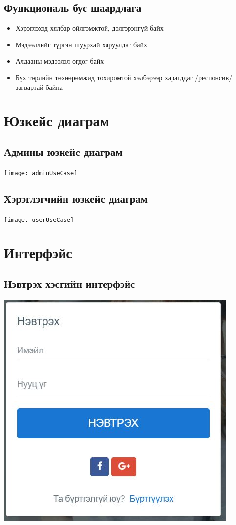 \documentclass[
oneside, %
english, %
onehalfspacing, %
nolistspacing, %
headsepline, %
]{article} %
\begin{document}
	\subsection{Функциональ бус шаардлага}
	\begin{itemize}
		\item Хэрэглэхэд хялбар ойлгомжтой, дэлгэрэнгүй байх
		\item Мэдээллийг түргэн шуурхай харуулдаг байх
		\item Алдааны мэдээлэл өгдөг байх 
		\item Бүх төрлийн төхөөрөмжид тохиромтой хэлбэрээр харагддаг /респонсив/ загвартай байна
	\end{itemize}
	\section{Юзкейс диаграм}
	\subsection{Админы юзкейс диаграм}
     \texttt{[image: adminUseCase]}
	\subsection{Хэрэглэгчийн юзкейс диаграм}
     \texttt{[image: userUseCase]}
     	\section{Интерфэйс}
     	\subsection{Нэвтрэх хэсгийн интерфэйс}
     \includegraphics[width=\textwidth]{login}
\end{document}
